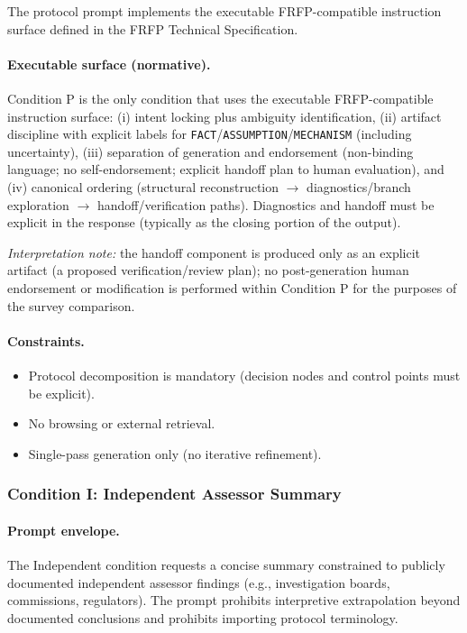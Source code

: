 The protocol prompt implements the executable FRFP-compatible
instruction surface defined in the FRFP Technical Specification.

\paragraph{Executable surface (normative).}
Condition P is the only condition that uses the executable FRFP-compatible instruction surface:
(i) intent locking plus ambiguity identification,
(ii) artifact discipline with explicit labels for \texttt{FACT}/\texttt{ASSUMPTION}/\texttt{MECHANISM} (including uncertainty),
(iii) separation of generation and endorsement (non-binding language; no self-endorsement; explicit handoff plan to human evaluation),
and (iv) canonical ordering (structural reconstruction $\rightarrow$ diagnostics/branch exploration $\rightarrow$
handoff/verification paths). Diagnostics and handoff must be explicit in the response (typically as the closing portion of
the output).

\emph{Interpretation note:} the handoff component is produced only as an explicit artifact (a proposed verification/review plan);
no post-generation human endorsement or modification is performed within Condition P for the purposes of the survey comparison.

\paragraph{Constraints.}
\begin{itemize}
  \item Protocol decomposition is mandatory (decision nodes and control points must be explicit).
  \item No browsing or external retrieval.
  \item Single-pass generation only (no iterative refinement).
\end{itemize}

\subsubsection{Condition I: Independent Assessor Summary}

\paragraph{Prompt envelope.}
The Independent condition requests a concise summary constrained to publicly documented independent assessor findings (e.g., investigation boards, commissions, regulators). The prompt prohibits interpretive extrapolation beyond documented conclusions and prohibits importing protocol terminology.

